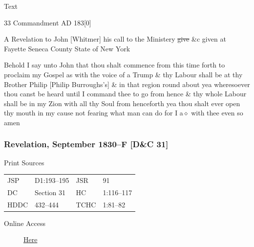 			\begin{description}
				\item[Text]
			\end{description}
			
				\begin{tightcenter}
				33 Commandment AD 183[0]
				\end{tightcenter}
				
				A Revelation to John [Whitmer] his call to the Ministery \sout{give} \&c given at Fayette Seneca County State of New York
				
				Behold I say unto John that thou shalt commence from this time forth to proclaim my Gospel as with the voice of a Trump \& thy Labour shall be at thy Brother Philip [Philip Burroughs's] \& in that region round about yea wheresoever thou canst be heard until I command thee to go from hence \& thy whole Labour shall be in my Zion with all thy Soul from henceforth yea thou shalt ever open thy mouth in my cause not fearing what man can do for I a$\diamond$ with thee even so amen
				
		\subsubsection{Revelation, September 1830--F [D\&C 31]}
			\label{EMS-1830-JS-SEP-1830-F}
		
			\begin{description}
				\item[Print Sources]
			\end{description}

				\begin{tabular}{p{0.5in}p{1in}p{0.5in}p{1in}}
				JSP	 	& D1:193--195	& JSR 		& 91	 \\
				DC	 	& Section 31	& HC 		& 1:116--117 \\
				HDDC 	& 432--444		& TCHC 		& 1:81--82 \\
				\end{tabular}
			
			\begin{description}
				\item[Online Access] \href{https://www.josephsmithpapers.org/paper-summary/revelation-september-1830-f-dc-31/1}{Here}
			\end{description}
			
